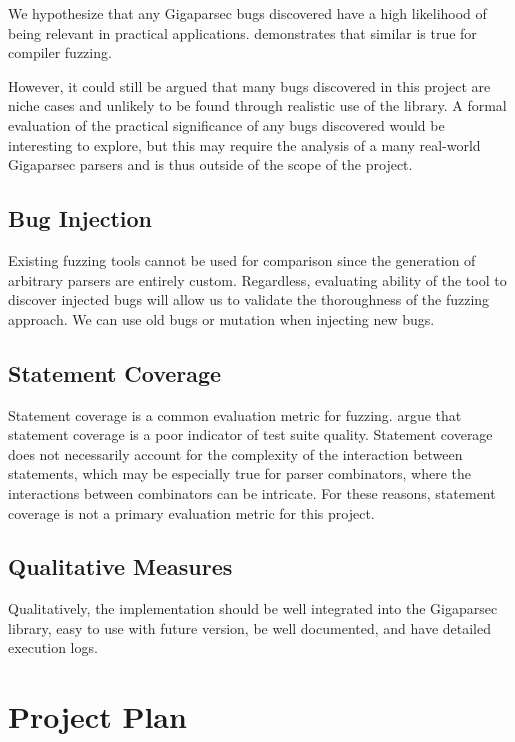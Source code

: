 \documentclass[11pt]{article}
\let\oldciteauthor\citeauthor
\renewcommand{\citeauthor}[1]{\oldciteauthor{#1} \cite{#1}}
\begin{document}
We hypothesize that any Gigaparsec bugs discovered have a high likelihood of being relevant in practical applications. \citeauthor{fuzzing-importance} demonstrates that similar is true for compiler fuzzing.

However, it could still be argued that many bugs discovered in this project are niche cases and unlikely to be found through realistic use of the library. A formal evaluation of the practical significance of any bugs discovered would be interesting to explore, but this may require the analysis of a many real-world Gigaparsec parsers and is thus outside of the scope of the project.

\subsection{Bug Injection}

Existing fuzzing tools cannot be used for comparison since the generation of arbitrary parsers are entirely custom. Regardless, evaluating ability of the tool to discover injected bugs will allow us to validate the thoroughness of the fuzzing approach. We can use old bugs or mutation when injecting new bugs.

\subsection{Statement Coverage}

Statement coverage is a common evaluation metric for fuzzing. \citeauthor{coverage} argue that statement coverage is a poor indicator of test suite quality. Statement coverage does not necessarily account for the complexity of the interaction between statements, which may be especially true for parser combinators, where the interactions between combinators can be intricate. For these reasons, statement coverage is not a primary evaluation metric for this project.

\subsection{Qualitative Measures}

Qualitatively, the implementation should be well integrated into the Gigaparsec library, easy to use with future version, be well documented, and have detailed execution logs.

\section{Project Plan} %
\end{document}
